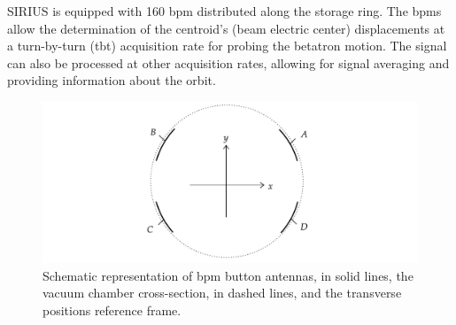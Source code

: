 SIRIUS is equipped with 160 \gls*{bpm} distributed along the storage ring. The \glspl*{bpm} allow the determination of the centroid's (beam electric center) displacements at a turn-by-turn (\gls*{tbt}) acquisition rate for probing the betatron motion. The signal can also be processed at other acquisition rates, allowing for signal averaging and providing information about the orbit.
\begin{figure}
    \centering
    \includegraphics[width=\textwidth]{Images/bpm_scheme.pdf}
    \caption[Schematic representation of BPM button antennas, the vacuum chamber cross-section, and the transverse positions reference frame.]{Schematic representation of \gls*{bpm} button antennas, in solid lines, the vacuum chamber cross-section, in dashed lines, and the transverse positions reference frame.}
    \label{fig:bpms_scheme}
\end{figure}

